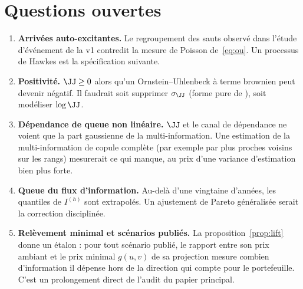 \section{Questions ouvertes}
\label{sec:open}

\begin{enumerate}
\item \textbf{Arrivées auto-excitantes.} Le regroupement des sauts observé dans
l'étude d'événement de la v1 contredit la mesure de Poisson de~\eqref{eq:ou}.
Un processus de Hawkes est la spécification suivante.
\item \textbf{Positivité.} $\JJ\ge0$ alors qu'un Ornstein--Uhlenbeck à terme
brownien peut devenir négatif. Il faudrait soit supprimer $\sigma_\JJ$ (forme
pure de \citealt{bns2001}), soit modéliser $\log\JJ$.
\item \textbf{Dépendance de queue non linéaire.} $\JJ$ et le canal de dépendance
ne voient que la part gaussienne de la multi-information. Une estimation de la
multi-information de copule complète (par exemple par plus proches voisins sur
les rangs) mesurerait ce qui manque, au prix d'une variance d'estimation bien
plus forte.
\item \textbf{Queue du flux d'information.} Au-delà d'une vingtaine d'années,
les quantiles de $I^{(h)}$ sont extrapolés. Un ajustement de Pareto généralisée
serait la correction disciplinée.
\item \textbf{Relèvement minimal et scénarios publiés.} La
proposition~\ref{prop:lift} donne un étalon : pour tout scénario publié, le
rapport entre son prix ambiant et le prix minimal $g(u,v)$ de sa projection
mesure combien d'information il dépense hors de la direction qui compte pour le
portefeuille. C'est un prolongement direct de l'audit du papier principal.
\end{enumerate}
